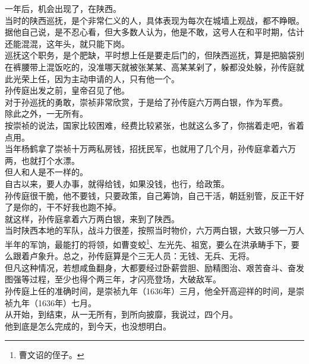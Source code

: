 \begin{multicols}{\theparacolNo}
一年后，机会出现了，在陕西。\\

当时的陕西巡抚，是个非常仁义的人，具体表现为每次在城墙上观战，都不睁眼。据他自己说，是不忍心看，但大多数人认为，他是不敢，这号人在和平时期，估计还能混混，这年头，就只能下岗。\\

巡抚这个职务，是个肥缺，平时想上任是要走后门的，但陕西巡抚，算是把脑袋别在裤腰带上混饭吃的，没准哪天就被张某某、高某某剁了，躲都没处躲，孙传庭就此光荣上任，因为主动申请的人，只有他一个。\\

孙传庭出发之前，皇帝召见了他。\\

对于孙巡抚的勇敢，崇祯非常欣赏，于是给了孙传庭六万两白银，作为军费。\\

除此之外，一无所有。\\

按崇祯的说法，国家比较困难，经费比较紧张，也就这么多了，你揣着走吧，省着点用。\\

当年杨鹤拿了崇祯十万两私房钱，招抚民军，也就用了几个月，孙传庭拿着六万两，也就打个水漂。\\

但人和人是不一样的。\\

自古以来，要人办事，就得给钱，如果没钱，也行，给政策。\\

孙传庭很干脆，他不要钱，只要政策，自己筹饷，自己干活，朝廷别管，反正干好了是你的，干不好我也跑不掉。\\

就这样，孙传庭拿着六万两白银，来到了陕西。\\

当时陕西本地的军队，战斗力很差，按照当时物价，六万两白银，大致只够一万人半年的军饷，最能打的将领，如曹变蛟\footnote{曹文诏的侄子。}、左光先、祖宽，要么在洪承畴手下，要么跟着卢象升。总之，孙传庭算是个三无人员：无钱、无兵、无将。\\

但凡这种情况，若想咸鱼翻身，大都要经过卧薪尝胆、励精图治、艰苦奋斗、奋发图强等过程，至少也得个两三年，才闪亮登场，大破敌军。\\

孙传庭上任的准确时间，是崇祯九年（1636年）三月，他全歼高迎祥的时间，是崇祯九年（1636年）七月。\\

从开始，到结束，从一无所有，到所向披靡，我说过，四个月。\\

他到底是怎么完成的，到今天，也没想明白。\\
\ifnum{}
	\end{multicols}
\fi
\newpage
